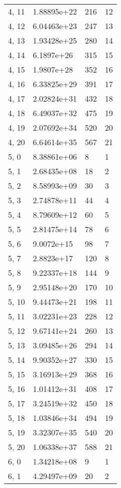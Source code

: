\begin{table}
\begin{tabular}{llll}
4, 11  &  1.88895e+22 &  216 &    12 \\
4, 12  &  6.04463e+23 &  247 &    13 \\
4, 13  &  1.93428e+25 &  280 &    14 \\
4, 14  &   6.1897e+26 &  315 &    15 \\
4, 15  &   1.9807e+28 &  352 &    16 \\
4, 16  &  6.33825e+29 &  391 &    17 \\
4, 17  &  2.02824e+31 &  432 &    18 \\
4, 18  &  6.49037e+32 &  475 &    19 \\
4, 19  &  2.07692e+34 &  520 &    20 \\
4, 20  &  6.64614e+35 &  567 &    21 \\
5, 0   &  8.38861e+06 &    8 &     1 \\
5, 1   &  2.68435e+08 &   18 &     2 \\
5, 2   &  8.58993e+09 &   30 &     3 \\
5, 3   &  2.74878e+11 &   44 &     4 \\
5, 4   &  8.79609e+12 &   60 &     5 \\
5, 5   &  2.81475e+14 &   78 &     6 \\
5, 6   &   9.0072e+15 &   98 &     7 \\
5, 7   &   2.8823e+17 &  120 &     8 \\
5, 8   &  9.22337e+18 &  144 &     9 \\
5, 9   &  2.95148e+20 &  170 &    10 \\
5, 10  &  9.44473e+21 &  198 &    11 \\
5, 11  &  3.02231e+23 &  228 &    12 \\
5, 12  &  9.67141e+24 &  260 &    13 \\
5, 13  &  3.09485e+26 &  294 &    14 \\
5, 14  &  9.90352e+27 &  330 &    15 \\
5, 15  &  3.16913e+29 &  368 &    16 \\
5, 16  &  1.01412e+31 &  408 &    17 \\
5, 17  &  3.24519e+32 &  450 &    18 \\
5, 18  &  1.03846e+34 &  494 &    19 \\
5, 19  &  3.32307e+35 &  540 &    20 \\
5, 20  &  1.06338e+37 &  588 &    21 \\
6, 0   &  1.34218e+08 &    9 &     1 \\
6, 1   &  4.29497e+09 &   20 &     2 \\

\end{tabular}
\end{table}

